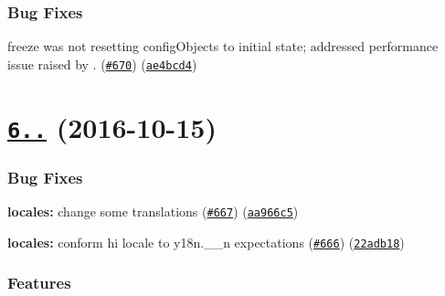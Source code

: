 \subsubsection*{Bug Fixes}


\begin{DoxyItemize}
\item freeze was not resetting config\+Objects to initial state; addressed performance issue raised by \href{https://github.com/nexdrew}{\tt }. (\href{https://github.com/yargs/yargs/issues/670}{\tt \#670}) (\href{https://github.com/yargs/yargs/commit/ae4bcd4}{\tt ae4bcd4})
\end{DoxyItemize}

\label{_6.1.0}%
 \section*{\href{https://github.com/yargs/yargs/compare/v6.0.0...v6.1.0}{\tt 6..} (2016-\/10-\/15)}

\subsubsection*{Bug Fixes}


\begin{DoxyItemize}
\item {\bfseries locales\+:} change some translations (\href{https://github.com/yargs/yargs/issues/667}{\tt \#667}) (\href{https://github.com/yargs/yargs/commit/aa966c5}{\tt aa966c5})
\item {\bfseries locales\+:} conform hi locale to y18n.\+\_\+\+\_\+n expectations (\href{https://github.com/yargs/yargs/issues/666}{\tt \#666}) (\href{https://github.com/yargs/yargs/commit/22adb18}{\tt 22adb18})
\end{DoxyItemize}

\subsubsection*{Features}


